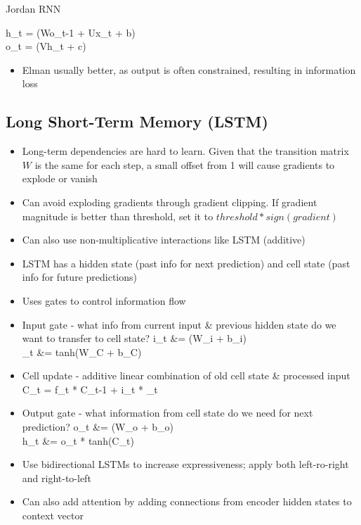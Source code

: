 \documentclass[12pt]{article}
\newenvironment{eqn}{\equation\alignedat{3}}{\endalignedat\endequation}
\begin{document}
Jordan RNN

\begin{eqn}
	h_t = \sigma(Wo_{t-1} + Ux_t + b) \\ 
	o_t = \phi(Vh_t + c)
\end{eqn}

\begin{itemize}
	\item Elman usually better, as output is often constrained, resulting in information loss
\end{itemize}

\subsection{Long Short-Term Memory (LSTM)}

\begin{itemize}
	\item Long-term dependencies are hard to learn. Given that the transition matrix $W$ is the same for each step, a small offset from 1 will cause gradients to explode or vanish
	\item Can avoid exploding gradients through gradient clipping. If gradient magnitude is better than threshold, set it to $threshold * sign(gradient)$
	\item Can also use non-multiplicative interactions like LSTM (additive)
	\item LSTM has a hidden state (past info for next prediction) and cell state (past info for future predictions)
	\item Uses gates to control information flow 
	\item Input gate - what info from current input \& previous hidden state do we want to transfer to cell state?
	\begin{eqn}
		i_t &= \sigma(W_i \cdot \left[ h_{t-1}, x_t \right] + b_i) \\ 
		_t &= tanh(W_C \cdot \left[ h_{t-1}, x_t \right] + b_C)
	\end{eqn}
	\item Cell update - additive linear combination of old cell state \& processed input 
	\begin{eqn}
		C_t = f_t * C_{t-1} + i_t * _t
	\end{eqn}
	\item Output gate - what information from cell state do we need for next prediction? 
	\begin{eqn}
		o_t &= \sigma(W_o \left[ h_{t-1}, x_t \right] + b_o) \\
		h_t &= o_t * tanh(C_t)
	\end{eqn}
	\item Use bidirectional LSTMs to increase expressiveness; apply both left-ro-right and right-to-left 
	\item Can also add attention by adding connections from encoder hidden states to context vector
\end{itemize}
\end{document}
